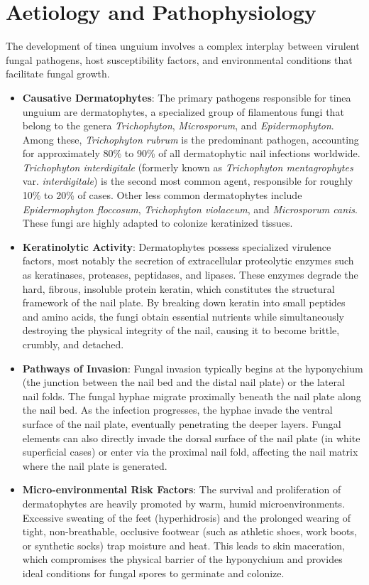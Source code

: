 \section*{Aetiology and Pathophysiology}
The development of tinea unguium involves a complex interplay between virulent fungal pathogens, host susceptibility factors, and environmental conditions that facilitate fungal growth.

\begin{itemize}
    \item \textbf{Causative Dermatophytes}: The primary pathogens responsible for tinea unguium are dermatophytes, a specialized group of filamentous fungi that belong to the genera \textit{Trichophyton}, \textit{Microsporum}, and \textit{Epidermophyton}. Among these, \textit{Trichophyton rubrum} is the predominant pathogen, accounting for approximately 80\% to 90\% of all dermatophytic nail infections worldwide. \textit{Trichophyton interdigitale} (formerly known as \textit{Trichophyton mentagrophytes} var. \textit{interdigitale}) is the second most common agent, responsible for roughly 10\% to 20\% of cases. Other less common dermatophytes include \textit{Epidermophyton floccosum}, \textit{Trichophyton violaceum}, and \textit{Microsporum canis}. These fungi are highly adapted to colonize keratinized tissues.
    \item \textbf{Keratinolytic Activity}: Dermatophytes possess specialized virulence factors, most notably the secretion of extracellular proteolytic enzymes such as keratinases, proteases, peptidases, and lipases. These enzymes degrade the hard, fibrous, insoluble protein keratin, which constitutes the structural framework of the nail plate. By breaking down keratin into small peptides and amino acids, the fungi obtain essential nutrients while simultaneously destroying the physical integrity of the nail, causing it to become brittle, crumbly, and detached.
    \item \textbf{Pathways of Invasion}: Fungal invasion typically begins at the hyponychium (the junction between the nail bed and the distal nail plate) or the lateral nail folds. The fungal hyphae migrate proximally beneath the nail plate along the nail bed. As the infection progresses, the hyphae invade the ventral surface of the nail plate, eventually penetrating the deeper layers. Fungal elements can also directly invade the dorsal surface of the nail plate (in white superficial cases) or enter via the proximal nail fold, affecting the nail matrix where the nail plate is generated.
    \item \textbf{Micro-environmental Risk Factors}: The survival and proliferation of dermatophytes are heavily promoted by warm, humid microenvironments. Excessive sweating of the feet (hyperhidrosis) and the prolonged wearing of tight, non-breathable, occlusive footwear (such as athletic shoes, work boots, or synthetic socks) trap moisture and heat. This leads to skin maceration, which compromises the physical barrier of the hyponychium and provides ideal conditions for fungal spores to germinate and colonize.

\end{itemize}
